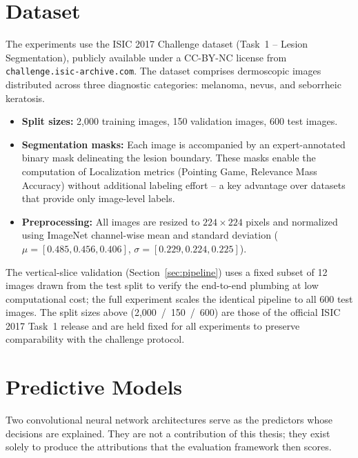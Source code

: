 \section{Dataset}
\label{sec:dataset}

The experiments use the ISIC 2017 Challenge dataset (Task~1 -- Lesion
Segmentation), publicly available under a CC-BY-NC license from
\texttt{challenge.isic-archive.com}. The dataset comprises dermoscopic
images distributed across three diagnostic categories: melanoma, nevus, and
seborrheic keratosis.

\begin{itemize}
    \item \textbf{Split sizes:} 2{,}000 training images, 150 validation
    images, 600 test images.
    \item \textbf{Segmentation masks:} Each image is accompanied by an
    expert-annotated binary mask delineating the lesion boundary. These masks
    enable the computation of Localization metrics (Pointing Game, Relevance
    Mass Accuracy) without additional labeling effort -- a key advantage over
    datasets that provide only image-level labels.
    \item \textbf{Preprocessing:} All images are resized to $224 \times 224$
    pixels and normalized using ImageNet channel-wise mean and standard
    deviation ($\mu = [0.485, 0.456, 0.406]$, $\sigma = [0.229, 0.224,
    0.225]$).
\end{itemize}

The vertical-slice validation (Section~\ref{sec:pipeline}) uses a fixed
subset of 12 images drawn from the test split to verify the end-to-end
plumbing at low computational cost; the full experiment scales the
identical pipeline to all 600 test images. The split sizes above
(2{,}000~/~150~/~600) are those of the official ISIC 2017 Task~1 release
and are held fixed for all experiments to preserve comparability with the
challenge protocol.

\section{Predictive Models}
\label{sec:models}

Two convolutional neural network architectures serve as the predictors whose
decisions are explained. They are not a contribution of this thesis; they
exist solely to produce the attributions that the evaluation framework then
scores.

